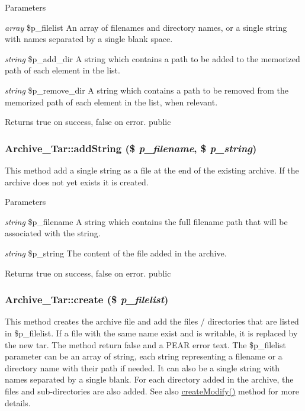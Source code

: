 \begin{DoxyParams}{Parameters}
\item[{\em array}]\$p\_\-filelist An array of filenames and directory names, or a single string with names separated by a single blank space. \item[{\em string}]\$p\_\-add\_\-dir A string which contains a path to be added to the memorized path of each element in the list. \item[{\em string}]\$p\_\-remove\_\-dir A string which contains a path to be removed from the memorized path of each element in the list, when relevant. \end{DoxyParams}
\begin{DoxyReturn}{Returns}
true on success, false on error.  public 
\end{DoxyReturn}
\hypertarget{classArchive__Tar_a245e7d8942e653113c37ff4324757ecf}{
\subsubsection[{addString}]{\setlength{\rightskip}{0pt plus 5cm}Archive\_\-Tar::addString (\$ {\em p\_\-filename}, \/  \$ {\em p\_\-string})}}
\label{classArchive__Tar_a245e7d8942e653113c37ff4324757ecf}
This method add a single string as a file at the end of the existing archive. If the archive does not yet exists it is created.


\begin{DoxyParams}{Parameters}
\item[{\em string}]\$p\_\-filename A string which contains the full filename path that will be associated with the string. \item[{\em string}]\$p\_\-string The content of the file added in the archive. \end{DoxyParams}
\begin{DoxyReturn}{Returns}
true on success, false on error.  public 
\end{DoxyReturn}
\hypertarget{classArchive__Tar_ad96d5e37735b750dffc2bd6a6eb0ec9a}{
\subsubsection[{create}]{\setlength{\rightskip}{0pt plus 5cm}Archive\_\-Tar::create (\$ {\em p\_\-filelist})}}
\label{classArchive__Tar_ad96d5e37735b750dffc2bd6a6eb0ec9a}
This method creates the archive file and add the files / directories that are listed in \$p\_\-filelist. If a file with the same name exist and is writable, it is replaced by the new tar. The method return false and a PEAR error text. The \$p\_\-filelist parameter can be an array of string, each string representing a filename or a directory name with their path if needed. It can also be a single string with names separated by a single blank. For each directory added in the archive, the files and sub-\/directories are also added. See also \hyperlink{classArchive__Tar_accecf70468a22e87d19a927f6802b8f2}{createModify()} method for more details.


